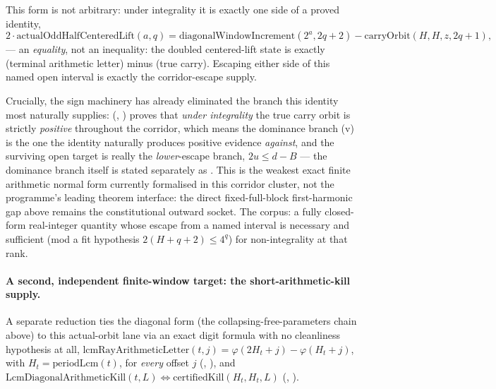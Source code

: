 This form is not arbitrary: under integrality it is exactly one side of a
proved identity,
\[
  2\cdot\mathrm{actualOddHalfCenteredLift}(a,q)
  = \mathrm{diagonalWindowIncrement}(2^a,2q{+}2) - \mathrm{carryOrbit}(H,H,z,2q{+}1),
\]
\quad {} \quad {} \quad {} — an
\emph{equality}, not an inequality: the doubled centered-lift state is
exactly (terminal arithmetic letter) minus (true carry). Escaping either
side of this named open interval is exactly the corridor-escape supply.

Crucially, the sign machinery has already eliminated the branch this
identity most naturally supplies:
(, ) proves that \emph{under integrality} the true
carry orbit is strictly \emph{positive} throughout the corridor, which
means the dominance branch (v) is the one the identity naturally produces
positive evidence \emph{against}, and the surviving open target is really
the \emph{lower}-escape branch,
$2u \le d - B$ — the dominance branch itself is stated separately as
. This is the weakest exact
finite arithmetic normal form currently formalised in this corridor cluster,
not the programme's leading theorem interface: the direct fixed-full-block
first-harmonic gap above remains the constitutional outward socket.  The
corpus: a fully closed-form real-integer quantity whose escape from a named
interval is necessary and sufficient (mod a fit hypothesis
$2(H{+}q{+}2)\le 4^q$) for non-integrality at that rank.

\paragraph{A second, independent finite-window target: the short-arithmetic-kill supply.}
A separate reduction ties the diagonal form (the collapsing-free-parameters chain above) to this actual-orbit
lane via an exact digit formula with no cleanliness hypothesis at all,
$\mathrm{lcmRayArithmeticLetter}(t,j) = \varphi(2H_t+j)-\varphi(H_t+j)$, with
$H_t=\mathrm{periodLcm}(t)$, for
\emph{every} offset $j$
(,
), and
$\mathrm{LcmDiagonalArithmeticKill}(t,L)\iff\mathrm{certifiedKill}(H_t,H_t,L)$
(,
).

